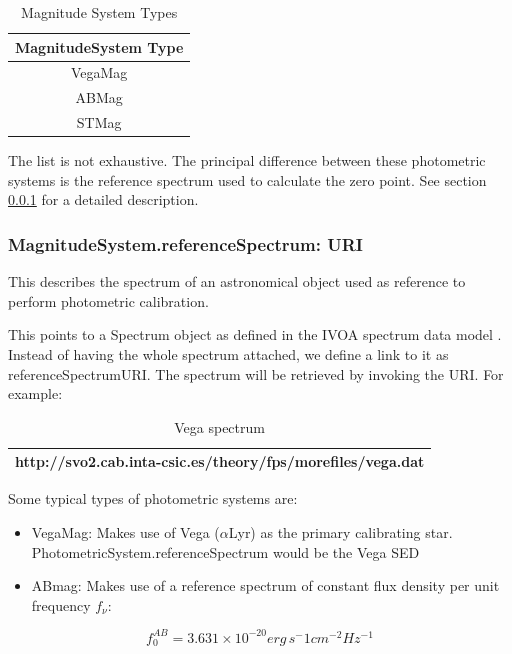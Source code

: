 \documentclass[11pt,a4paper]{ivoa}
\begin{document}


\begin{table}[H]
 			\centering
\begin{tabular}{|c|}
\hline
\bf{MagnitudeSystem Type}\\
\hline
VegaMag\\
\hline
ABMag\\
\hline
STMag\\
\hline
\end{tabular}
\caption{Magnitude System Types}
 \end{table}



The list is not exhaustive. The principal difference between these
photometric systems is the reference spectrum used to calculate the
zero point. See section \ref{referenceSpectrum} for a detailed description.
\par

\subsubsection{MagnitudeSystem.referenceSpectrum: URI} \label{referenceSpectrum}
This describes the spectrum of an astronomical object used as
reference to perform photometric calibration.
\par

This points to a Spectrum object as defined in the IVOA spectrum data
model \citep{2011ivoa.spec.1120M}. Instead of having the whole spectrum
attached, we define a link to it as referenceSpectrumURI.
The spectrum will be retrieved by invoking the URI. For example:
\par


\begin{table}[H]
 			\centering
\begin{tabular}{p{4.42in}}
\hline
http://svo2.cab.inta-csic.es/theory/fps/morefiles/vega.dat \\
\hline
\end{tabular}
\caption{Vega spectrum}
 \end{table}

Some typical types of photometric systems are:
\par

\begin{itemize}
	\item{VegaMag: Makes use of Vega ($\alpha $Lyr) as the primary calibrating
	star. PhotometricSystem.referenceSpectrum would be the Vega SED\par}

	\item{ABmag: Makes use of a reference spectrum of constant flux
	density per unit frequency $f_\nu $:}
\end{itemize}
\begin{equation} \label{eq:31}
f_0^{AB} = 3.631 \times 10^{-20} erg\, s^-1 cm^{-2} Hz^{-1}
\end{equation}
\end{document}
